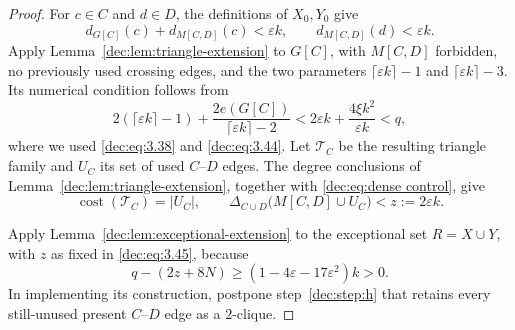 \documentclass[11pt]{article}
\numberwithin{equation}{section}
\theoremstyle{remark}
\DeclareMathOperator{\cost}{cost}
\newcommand{\e}{\varepsilon}
\begin{document}
\begin{proof}
For \(c\in C\) and \(d\in D\), the definitions of \(X_0,Y_0\) give
\begin{equation}\label{dec:eq:dense control}
 d_{G[C]}(c)+d_{M[C,D]}(c)<\e k,
 \qquad d_{M[C,D]}(d)<\e k.
\end{equation}
Apply Lemma~\ref{dec:lem:triangle-extension} to \(G[C]\), with
\(M[C,D]\) forbidden, no previously used crossing edges, and the two parameters
\(\lceil\e k\rceil-1\) and \(\lceil\e k\rceil-3\).  Its numerical condition follows from
\begin{equation*}
 2(\lceil\e k\rceil-1)
 +\frac{2e(G[C])}{\lceil\e k\rceil-2}
 <2\e k+\frac{4\xi k^2}{\e k}<q,
\end{equation*}
where we used \eqref{dec:eq:3.38} and \eqref{dec:eq:3.44}.  Let \(\mathcal T_C\) be the resulting
triangle family and \(U_C\) its set of used \(C\)--\(D\) edges.  The degree
conclusions of Lemma~\ref{dec:lem:triangle-extension}, together with \eqref{dec:eq:dense control}, give
\begin{equation}\label{dec:eq:3.45}
 \cost(\mathcal T_C)=|U_C|,
 \qquad
 \Delta_{C\cup D}\bigl(M[C,D]\cup U_C\bigr)< z:=2\e k.
\end{equation}

Apply Lemma~\ref{dec:lem:exceptional-extension} to the exceptional set
\(R=X\cup Y\), with \(z\) as fixed in \eqref{dec:eq:3.45}, because
\begin{equation*}
  q-(2z+8N)
  \ge(1-4\e-17\e^2)k>0.
\end{equation*}
In implementing its construction, postpone step~\ref{dec:step:h} that retains
every still-unused present \(C\)--\(D\) edge as a \(2\)-clique.


\end{proof}
\end{document}
